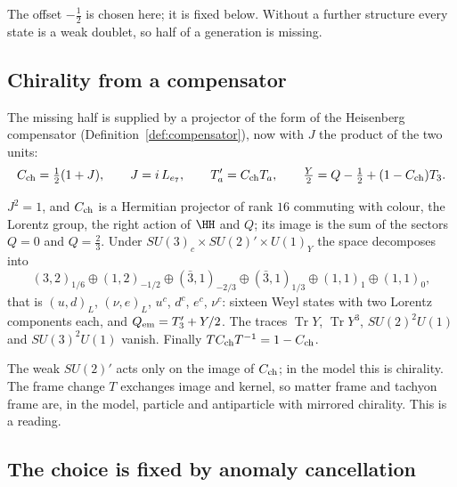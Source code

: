 The offset \(-\tfrac12\) is chosen here; it is fixed below.  Without a further structure every state is a weak doublet, so half of a
generation is missing.

\subsection{Chirality from a compensator}

The missing half is supplied by a projector of the form of the Heisenberg compensator (Definition~\ref{def:compensator}), now with
\(J\) the product of the two units:
\[
C_{\rm ch}=\tfrac12(1+J),\qquad J=i\,L_{e_7},\qquad T_a'=C_{\rm ch}T_a,\qquad
\tfrac Y2=Q-\tfrac12+(1-C_{\rm ch})T_3 .
\]

\begin{proposition}\label{prop:generation}
\(J^2=1\), and \(C_{\rm ch}\) is a Hermitian projector of rank \(16\) commuting with colour, the Lorentz group, the right action of \(\HH\) and
\(Q\); its image is the sum of the sectors \(Q=0\) and \(Q=\tfrac23\).  Under \(SU(3)_c\times SU(2)'\times U(1)_Y\) the space decomposes into
\[
(3,2)_{1/6}\oplus(1,2)_{-1/2}\oplus(\bar3,1)_{-2/3}\oplus(\bar3,1)_{1/3}\oplus(1,1)_{1}\oplus(1,1)_{0},
\]
that is \((u,d)_L\), \((\nu,e)_L\), \(u^c\), \(d^c\), \(e^c\), \(\nu^c\): sixteen Weyl states with two Lorentz components each, and
\(Q_{\rm em}=T_3'+Y/2\).  The traces \(\operatorname{Tr}Y\), \(\operatorname{Tr}Y^3\), \(SU(2)^2U(1)\) and \(SU(3)^2U(1)\) vanish.  Finally
\(TC_{\rm ch}T^{-1}=1-C_{\rm ch}\).
\end{proposition}

The weak \(SU(2)'\) acts only on the image of \(C_{\rm ch}\); in the model this is chirality.  The frame change \(T\) exchanges image
and kernel, so matter frame and tachyon frame are, in the model, particle and antiparticle with mirrored chirality.  This is a reading.

\subsection{The choice is fixed by anomaly cancellation}

